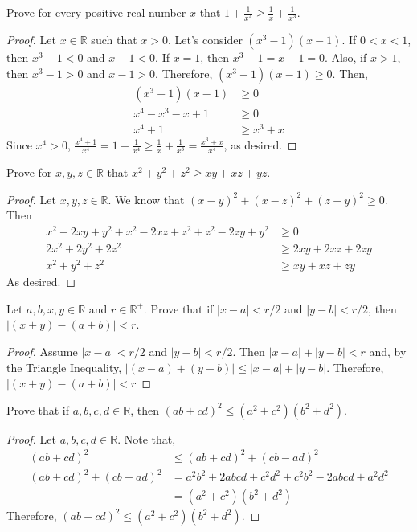 \documentclass[12pt]{article}
\newcommand{\R}{\mathbb{R}}
\newenvironment{problem}[2][Problem]{\begin{trivlist}
		\item[\hskip \labelsep {\bfseries #1}\hskip \labelsep {\bfseries #2.}]}{\end{trivlist}}
\begin{document}
	\begin{problem}{36} 
		Prove for every positive real number $x$ that $1+\frac{1}{x^{4}} \geq \frac{1}{x}+\frac{1}{x^{3}}$.
		\begin{proof}
			Let $x\in \R$ such that $x>0$. Let's consider $(x^{3}-1)(x-1)$. If $0<x<1$, then $x^{3}-1<0$ and $x-1<0$. If $x=1$, then $x^{3}-1=x-1=0$. Also, if $x>1$, then $x^{3}-1>0$ and $x-1>0$. Therefore, $(x^{3}-1)(x-1)\geq 0$. Then,
			\begin{align*}
				(x^{3}-1)(x-1)&\geq 0\\
				x^{4}-x^{3}-x+1&\geq 0\\
				x^{4}+1 &\geq x^{3}+x
			\end{align*}
		Since $x^{4}>0$, $\frac{x^{4}+1}{x^{4}} = 1+ \frac{1}{x^{4}} \geq   \frac{1}{x} + \frac{1}{x^{3}} = \frac{x^{3}+x}{x^{4}}$, as desired.
		\end{proof}
	\end{problem}

	\begin{problem}{37}
		Prove for $x,y,z\in \R$ that $x^{2}+y^{2}+z^{2} \geq xy+xz+yz$.
		\begin{proof}
			Let $x,y,z\in \R$. We know that $(x-y)^{2}+(x-z)^{2}+(z-y)^{2} \geq 0$. Then
			\begin{align*}
				x^{2} -2xy +y^{2} +x^{2} -2xz + z^{2} +z^{2}-2zy +y^{2} &\geq 0\\
				2x^{2} + 2y^{2} + 2z^{2} &\geq 2xy + 2xz +2zy\\
				x^{2} + y^{2} + z^{2} &\geq xy + xz +zy
			\end{align*}
		As desired.
		\end{proof}
	\end{problem}

	\begin{problem}{38}
		Let $a,b,x,y \in \R$ and $r\in \R^{+}$. Prove that if $|x-a|<r/2$ and $|y-b|<r/2$, then $|(x+y)-(a+b)|<r$.
		\begin{proof}
			Assume $|x-a|<r/2$ and $|y-b|<r/2$. Then $|x-a|+|y-b|<r$ and, by the Triangle Inequality, $|(x-a)+(y-b)|\leq |x-a|+|y-b|$. Therefore, $|(x+y)-(a+b)|<r$
		\end{proof}
	\end{problem}  

	\begin{problem}{39}
		Prove that if $a,b,c,d \in \R$, then $(ab+cd)^{2}\leq (a^{2}+c^{2})(b^{2}+d^{2})$.
		\begin{proof}
		Let $a,b,c,d \in \R$. Note that,
		\begin{align*}
			(ab+cd)^{2} &\leq (ab+cd)^{2}+(cb-ad)^{2}\\
			(ab+cd)^{2}+(cb-ad)^{2} &= a^{2}b^{2}+2abcd+c^{2}d^{2}+c^{2}b^{2}-2abcd+a^{2}d^{2}\\
			&= (a^{2}+c^{2})(b^{2}+d^{2})
		\end{align*}
		Therefore, $(ab+cd)^{2} \leq (a^{2}+c^{2})(b^{2}+d^{2})$.
		\end{proof}
	\end{problem}
\end{document}
